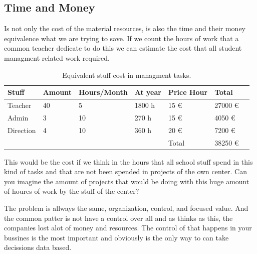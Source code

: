 \subsection{Time and Money}

Is not only the cost of the material resources, is also the time and their money
equivalence what we are trying to save.  If we count the hours of work that a
common teacher dedicate to do this we can estimate the cost that all student
managment related work required.

\begin{table}[H]
\centering

\begin{tabular}{@{}lllllll@{}}

Stuff & Amount & Hours/Month & At year & Price Hour & Total  \\
\midrule

Teacher     & 40 & 5    & 1800 h   & 15 \euro  & 27000  \euro  \\
Admin       & 3  & 10   & 270 h   & 15 \euro  & 4050   \euro  \\
Direction   & 4  & 10   & 360 h   & 20 \euro  & 7200   \euro  \\

\midrule
& & & & Total & 38250 \euro \\
\end{tabular}
\caption{Equivalent stuff cost in managment tasks. }
\label{my-label}
\end{table}

This would be the cost if we think in the hours that all school stuff spend
in this kind of tasks and that are not been spended in projects of the own
center.
Can you imagine the amount of projects that would be doing with this huge
amount of houres of work by the stuff of the center?

The problem is allways the same, organization, control, and focused value. And
the common patter is not have a control over all and as thinks as this, the
companies lost alot of money and resources. The control of that happens in your
bussines is the most important and obviously is the only way to can take
decissions data based.

